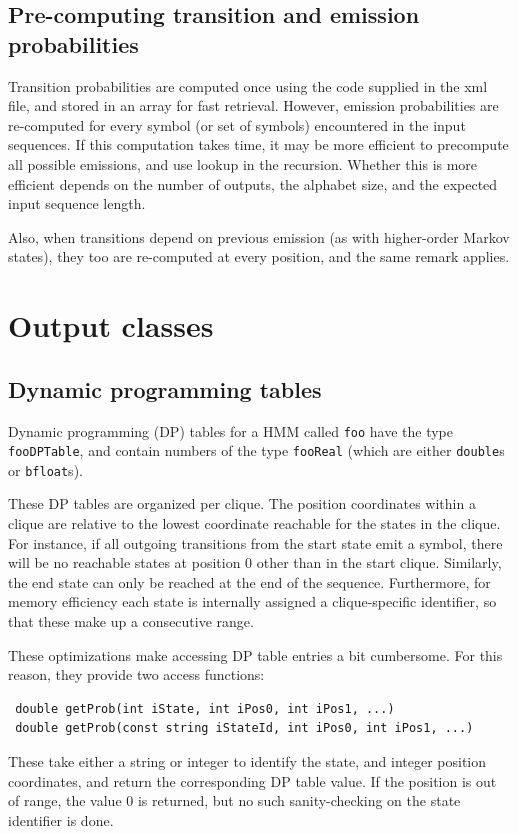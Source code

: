 \documentclass{article}
\begin{document}
\subsection{Pre-computing transition and emission probabilities}

Transition probabilities are computed once using the code supplied in the xml file, and stored
in an array for fast retrieval.  However, emission probabilities are re-computed for every symbol 
(or set of symbols) encountered in the input sequences.  If this computation takes time, it may be 
more efficient to precompute all possible emissions, and use lookup in the recursion.  Whether 
this is more efficient depends on the number of outputs, the alphabet size, and the expected input 
sequence length.

Also, when transitions depend on previous emission (as with higher-order Markov states), they too
are re-computed at every position, and the same remark applies.





\section{Output classes}


\subsection{Dynamic programming tables}


Dynamic programming (DP) tables for a HMM called {\tt foo} have the type {\tt fooDPTable},
and contain numbers of the type {\tt fooReal} (which are either {\tt double}s or {\tt bfloat}s).

These DP tables are organized per clique.  The position coordinates within a clique are 
relative to the lowest coordinate reachable for the states in the clique.  For 
instance, if all outgoing transitions from the start state emit a symbol, there will 
be no reachable states at position 0 other than in the start clique.  Similarly, the 
end state can only be reached at the end of the sequence.  Furthermore, for memory 
efficiency each state is internally assigned a clique-specific identifier, so that 
these make up a consecutive range.

These optimizations make accessing DP table entries a bit cumbersome.  For this
reason, they provide two access functions:

\begin{verbatim}
 double getProb(int iState, int iPos0, int iPos1, ...)
 double getProb(const string iStateId, int iPos0, int iPos1, ...)
\end{verbatim}
These take either a string or integer to identify the state, and integer position 
coordinates, and return the corresponding DP table value.  If the position is out of 
range, the value 0 is returned, but no such sanity-checking on the state identifier is 
done.  
\end{document}
